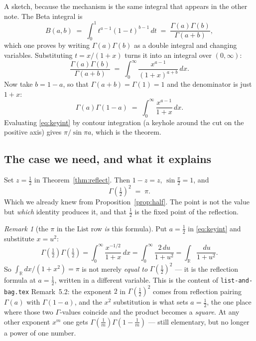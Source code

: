 \documentclass[11pt,a4paper]{article}
\theoremstyle{definition}
\theoremstyle{remark}
\newtheorem{remark}[theorem]{Remark}
\newcommand{\RR}{\mathbb{R}}
\newcommand{\dd}{\,d}
\begin{document}
A sketch, because the mechanism is the same integral that appears in the other note.
The Beta integral is
\[
  B(a,b) \;=\; \int_0^1 t^{a-1}(1-t)^{b-1}\dd t \;=\; \frac{\Gamma(a)\Gamma(b)}{\Gamma(a+b)} ,
\]
which one proves by writing $\Gamma(a)\Gamma(b)$ as a double integral and changing
variables. Substituting $t = x/(1+x)$ turns it into an integral over $(0,\infty)$:
\[
  \frac{\Gamma(a)\Gamma(b)}{\Gamma(a+b)} \;=\; \int_0^\infty \frac{x^{a-1}}{(1+x)^{a+b}}\dd x .
\]
Now take $b = 1-a$, so that $\Gamma(a+b) = \Gamma(1) = 1$ and the denominator is just
$1+x$:
\begin{equation}\label{eq:keyint}
  \Gamma(a)\Gamma(1-a) \;=\; \int_0^\infty \frac{x^{a-1}}{1+x}\dd x .
\end{equation}
Evaluating \eqref{eq:keyint} by contour integration (a keyhole around the cut on the
positive axis) gives $\pi/\sin \pi a$, which is the theorem.

\subsection{The case we need, and what it explains}

Set $z = \tfrac12$ in Theorem~\ref{thm:reflect}. Then $1 - z = z$, $\sin \tfrac{\pi}{2} = 1$, and
\begin{equation}\label{eq:halfrefl}
  \boxed{\;\Gamma(\tfrac12)^2 \;=\; \pi.\;}
\end{equation}
Which we already knew from Proposition~\ref{prop:half}. The point is not the value but
\emph{which} identity produces it, and that $\tfrac12$ is the fixed point of the
reflection.

\begin{remark}[the $\pi$ in the $\mathrm{List}$ row \emph{is} this formula]\label{rem:tie}
Put $a = \tfrac12$ in \eqref{eq:keyint} and substitute $x = u^2$:
\[
  \Gamma(\tfrac12)\Gamma(\tfrac12) = \int_0^\infty \frac{x^{-1/2}}{1+x}\dd x
  = \int_0^\infty \frac{2\dd u}{1+u^2} = \int_{\RR}\frac{\dd u}{1+u^2} .
\]
So $\int_\RR dx/(1+x^2) = \pi$ is not merely \emph{equal to} $\Gamma(\tfrac12)^2$ ---
it is the reflection formula at $a = \tfrac12$, written in a different variable. This
is the content of \texttt{list-and-bag.tex} Remark~5.2: the exponent $2$ in
$\Gamma(\tfrac12)^2$ comes from reflection pairing $\Gamma(a)$ with $\Gamma(1-a)$, and
the $x^2$ substitution is what sets $a = \tfrac12$, the one place where those two
$\Gamma$-values coincide and the product becomes a \emph{square}. At any other
exponent $x^m$ one gets $\Gamma(\tfrac1m)\Gamma(1-\tfrac1m)$ --- still elementary,
but no longer a power of one number.
\end{remark}
\end{document}
